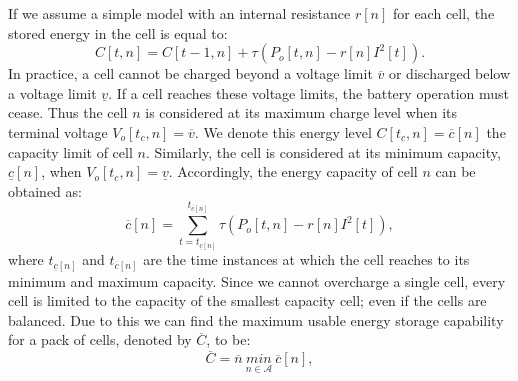 \documentclass[10pt,twocolumn]{IEEEtran}
\begin{document}
If we assume a simple model with an internal resistance $r[n]$ for each cell, the stored energy in the cell is equal to:
%
\begin{equation}
C[t,n]=C[t-1,n] +  \tau(P_{o}[t,n] - r[n]I^2[t]).
\label{energycell}
\end{equation}
%
\noindent In practice,  a cell cannot be charged beyond a voltage limit $\overline{v}$ or discharged below a voltage limit $\underline{v}$.
If a cell reaches these voltage limits, the battery operation must cease.
Thus the cell $n$ is considered at its maximum charge level when its terminal voltage $V_{o}[t_c,n]=\overline{v}$.
We denote this energy level $C[t_c,n]=\overline{c}[n]$    the capacity limit of cell $n$.
Similarly, the cell is considered at its minimum capacity, $\underline{c}[n]$, when $V_{o}[t_c,n]=\underline{v}$.
Accordingly, the energy  capacity of cell $n$ can be obtained  as:
%
\begin{equation}
\overline{c}[n]=   \sum_{t=t_{\underline{c}[n]}}^{t_{\overline{c}[n]} } \tau(P_{o}[t,n] - r[n]I^2[t]),
\end{equation}
\noindent where $t_{\underline{c}[n]}$ and $t_{\overline{c}[n]}$ are the time instances at which the  cell reaches to its minimum and maximum capacity.
Since we cannot overcharge a single cell, every cell is limited to the capacity of the smallest capacity cell; even if the cells are balanced.
Due to this we can find the maximum usable energy storage capability for a pack of cells, denoted by $ \overline{C}$,  to be:
%
\begin{equation}
\overline{C}=\overline{n} \ \underset{n\in \mathcal{A}}{min} \ \overline{c}[n] ,
\label{eq:lhscap}
\end{equation}
\end{document}

